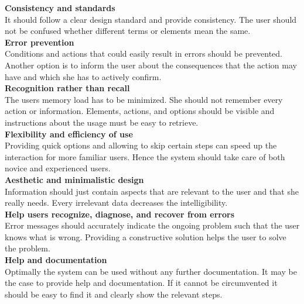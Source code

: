 \textbf{Consistency and standards}\\
It should follow a clear design standard and provide consistency. The user should not be confused whether different terms or elements mean the same.\\

\textbf{Error prevention}\\
Conditions and actions that could easily result in errors should be prevented. Another option is to inform the user about the consequences that the action may have and which she has to actively confirm.\\

\textbf{Recognition rather than recall}\\
The users memory load has to be minimized. She should not remember every action or information. Elements, actions, and options should be visible and instructions about the usage must be easy to retrieve.\\

\textbf{Flexibility and efficiency of use}\\
Providing quick options and allowing to skip certain steps can speed up the interaction for more familiar users. Hence the system should take care of both novice and experienced users.\\

\textbf{Aesthetic and minimalistic design}\\
Information should just contain aspects that are relevant to the user and that she really needs. Every irrelevant data decreases the intelligibility.\\

\textbf{Help users recognize, diagnose, and recover from errors}\\
Error messages should accurately indicate the ongoing problem such that the user knows what is wrong. Providing a constructive solution helps the user to solve the problem.\\

\textbf{Help and documentation}\\
Optimally the system can be used without any further documentation. It may be the case to provide help and documentation. If it cannot be circumvented it should be easy to find it and clearly show the relevant steps.\\

